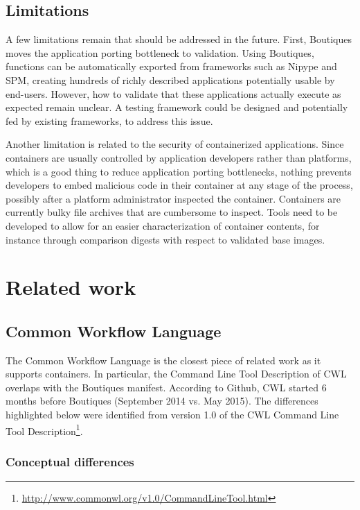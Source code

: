 \documentclass{article}
\newcommand{\boutiques}{Boutiques\xspace}
\begin{document}
\subsection{Limitations}

A few limitations remain that should be addressed in the
future. First, \boutiques moves the application porting bottleneck to
validation. Using \boutiques, functions can be automatically exported
from frameworks such as Nipype and SPM, creating hundreds of richly
described applications potentially usable by end-users. However, how
to validate that these applications actually execute as expected
remain unclear. A testing framework could be designed and potentially
fed by existing frameworks, to address this issue.

Another limitation is related to the security of containerized
applications. Since containers are usually controlled by application
developers rather than platforms, which is a good thing to reduce
application porting bottlenecks, nothing prevents developers to embed
malicious code in their container at any stage of the process,
possibly after a platform administrator inspected the
container. Containers are currently bulky file archives that are
cumbersome to inspect. Tools need to be developed to allow for an
easier characterization of container contents, for instance through
comparison digests with respect to validated base images.


\section{Related work}

\subsection{Common Workflow Language}

The Common Workflow Language is the closest piece of related work as
it supports containers. In particular, the Command Line Tool
Description of CWL overlaps with the \boutiques manifest. According to
Github, CWL started 6 months before Boutiques (September 2014 vs. May
2015). The differences highlighted below were identified from version
1.0 of the CWL Command Line Tool
Description\footnote{\url{http://www.commonwl.org/v1.0/CommandLineTool.html}}.

\subsubsection{Conceptual differences}
\end{document}
